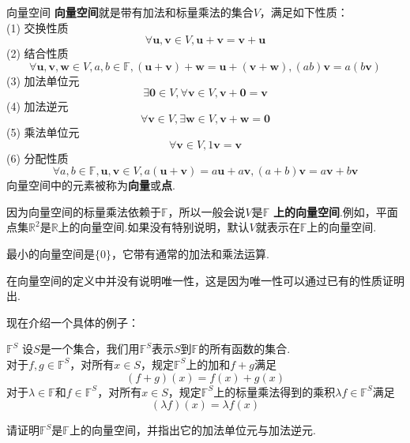 \documentclass[lang=cn, zihao=5]{elegantbook}
\newcommand{\R}{\mathbb{R}}
\newcommand{\F}{\mathbb{F}}
\begin{document}
\begin{definition}{向量空间}
	\textbf{向量空间}就是带有加法和标量乘法的集合$V$，满足如下性质： \\
	(1) 交换性质$$\forall \boldsymbol{u},\boldsymbol{v} \in V , \boldsymbol{u} + \boldsymbol{v} = \boldsymbol{v} + \boldsymbol{u}$$
	(2) 结合性质$$\forall \boldsymbol{u},\boldsymbol{v},\boldsymbol{w} \in V, a,b \in \F, (\boldsymbol{u} + \boldsymbol{v}) + \boldsymbol{w} = \boldsymbol{u} + (\boldsymbol{v} + \boldsymbol{w}) , (ab) \boldsymbol{v} = a (b\boldsymbol{v})$$
	(3) 加法单位元$$\exists \boldsymbol{0} \in V, \forall \boldsymbol{v} \in V , \boldsymbol{v} + \boldsymbol{0} = \boldsymbol{v}$$
	(4) 加法逆元$$\forall \boldsymbol{v} \in V , \exists \boldsymbol{w} \in V , \boldsymbol{v} + \boldsymbol{w} = \boldsymbol{0}$$
	(5) 乘法单位元$$\forall \boldsymbol{v} \in V , 1\boldsymbol{v} = \boldsymbol{v}$$
	(6) 分配性质$$\forall a,b \in \F , \boldsymbol{u},\boldsymbol{v} \in V , a (\boldsymbol{u} + \boldsymbol{v}) = a\boldsymbol{u} + a\boldsymbol{v} , (a+b)\boldsymbol{v} = a\boldsymbol{v}+b\boldsymbol{v}$$
	向量空间中的元素被称为\textbf{向量}或\textbf{点}.
\end{definition}
\begin{remark}
	因为向量空间的标量乘法依赖于$\F$，所以一般会说$V$是$\F$ \textbf{上的向量空间}.例如，平面点集$\R ^{2}$是$\R$上的向量空间.如果没有特别说明，默认$V$就表示在$\F$上的向量空间.
\end{remark}
\begin{remark}
	最小的向量空间是$\{ 0 \}$，它带有通常的加法和乘法运算.
\end{remark}
\begin{note}
	在向量空间的定义中并没有说明唯一性，这是因为唯一性可以通过已有的性质证明出.
\end{note}

现在介绍一个具体的例子：

\begin{definition}{$\F ^{S}$}
	设$S$是一个集合，我们用$\F ^{S}$表示$S$到$\F$的所有函数的集合. \\
	对于$f,g \in \F ^{S}$，对所有$x \in S$，规定$\F ^{S}$上的加和$f+g$满足$$(f+g)(x) = f(x) + g(x)$$
	对于$\lambda \in \F$和$f \in \F ^{S}$，对所有$x \in S$，规定$\F ^{S}$上的标量乘法得到的乘积$\lambda f \in \F ^{S}$满足$$(\lambda f)(x) = \lambda f(x)$$
\end{definition}

\begin{example}
	请证明$\F ^{S}$是$\F$上的向量空间，并指出它的加法单位元与加法逆元.
\end{example}
\end{document}
